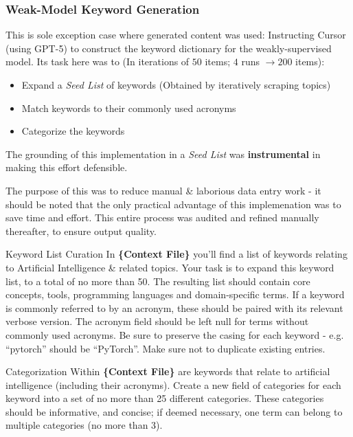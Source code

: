 \begin{appendices}
  \subsubsection{Weak-Model Keyword Generation} \label{appendix:weak-keyword-generation}
  This is sole exception case where generated content was used: Instructing Cursor (using GPT-5) to construct the keyword dictionary for the weakly-supervised model.
  Its task here was to (In iterations of $50$ items; $4$ runs $\rightarrow 200$ items):

  \begin{itemize}
    \item Expand a \emph{Seed List} of keywords (Obtained by iteratively scraping \gh{} topics)
    \item Match keywords to their commonly used acronyms
    \item Categorize the keywords
  \end{itemize}

  The grounding of this implementation in a \emph{Seed List} was \textbf{instrumental} in making this effort defensible.

  The purpose of this was to reduce manual \& laborious data entry work - it should be noted that the only practical advantage of this implemenation was to save time and effort.
  This entire process was audited and refined manually thereafter, to ensure output quality.

  \begin{prompt}{Keyword List Curation}
    In \textbf{\{Context File\}} you'll find a list of keywords relating to Artificial Intelligence \& related \ghrepo{} topics.
    Your task is to expand this keyword list, to a total of no more than 50.
    The resulting list should contain core concepts, tools, programming languages and domain-specific terms.
    If a keyword is commonly referred to by an acronym, these should be paired with its relevant verbose version.
    The acronym field should be left null for terms without commonly used acronyms.
    Be sure to preserve the casing for each keyword - e.g. ``pytorch'' should be ``PyTorch''.
    Make sure not to duplicate existing entries.
  \end{prompt}

  \begin{prompt}{Categorization}
    Within \textbf{\{Context File\}} are keywords that relate to artificial intelligence (including their acronyms).
    Create a new field of categories for each keyword into a set of no more than 25 different categories.
    These categories should be informative, and concise; if deemed necessary, one term can belong to multiple categories (no more than 3).
  \end{prompt}


\end{appendices}
